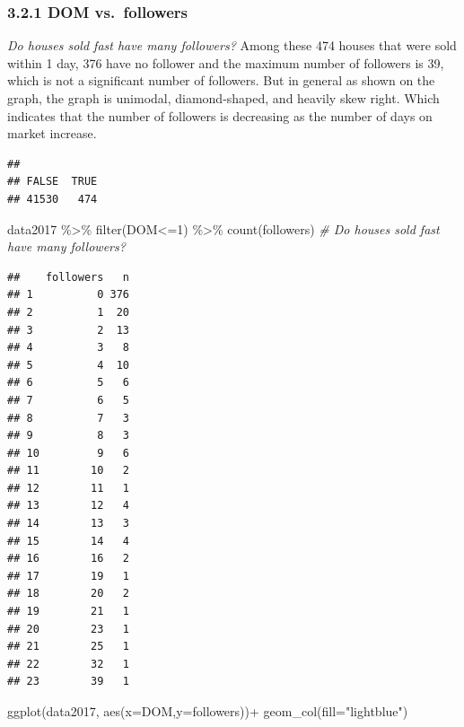 \documentclass[
]{article}
\newenvironment{Shaded}{\begin{snugshade}}{\end{snugshade}}
\newcommand{\AttributeTok}[1]{\textcolor[rgb]{0.77,0.63,0.00}{#1}}
\newcommand{\CommentTok}[1]{\textcolor[rgb]{0.56,0.35,0.01}{\textit{#1}}}
\newcommand{\DecValTok}[1]{\textcolor[rgb]{0.00,0.00,0.81}{#1}}
\newcommand{\FunctionTok}[1]{\textcolor[rgb]{0.00,0.00,0.00}{#1}}
\newcommand{\NormalTok}[1]{#1}
\newcommand{\SpecialCharTok}[1]{\textcolor[rgb]{0.00,0.00,0.00}{#1}}
\newcommand{\StringTok}[1]{\textcolor[rgb]{0.31,0.60,0.02}{#1}}
\begin{document}
\hypertarget{dom-vs.-followers}{%
\subsubsection{3.2.1 DOM vs.~followers}\label{dom-vs.-followers}}

\emph{Do houses sold fast have many followers?} Among these 474 houses
that were sold within 1 day, 376 have no follower and the maximum number
of followers is 39, which is not a significant number of followers. But
in general as shown on the graph, the graph is unimodal, diamond-shaped,
and heavily skew right. Which indicates that the number of followers is
decreasing as the number of days on market increase.

\begin{Shaded}
\end{Shaded}

\begin{verbatim}
## 
## FALSE  TRUE 
## 41530   474
\end{verbatim}

\begin{Shaded}
\begin{Highlighting}[]
\NormalTok{data2017 }\SpecialCharTok{\%\textgreater{}\%}
  \FunctionTok{filter}\NormalTok{(DOM}\SpecialCharTok{\textless{}=}\DecValTok{1}\NormalTok{) }\SpecialCharTok{\%\textgreater{}\%}
  \FunctionTok{count}\NormalTok{(followers) }\CommentTok{\# Do houses sold fast have many followers?}
\end{Highlighting}
\end{Shaded}

\begin{verbatim}
##    followers   n
## 1          0 376
## 2          1  20
## 3          2  13
## 4          3   8
## 5          4  10
## 6          5   6
## 7          6   5
## 8          7   3
## 9          8   3
## 10         9   6
## 11        10   2
## 12        11   1
## 13        12   4
## 14        13   3
## 15        14   4
## 16        16   2
## 17        19   1
## 18        20   2
## 19        21   1
## 20        23   1
## 21        25   1
## 22        32   1
## 23        39   1
\end{verbatim}

\begin{Shaded}
\begin{Highlighting}[]
\FunctionTok{ggplot}\NormalTok{(data2017, }\FunctionTok{aes}\NormalTok{(}\AttributeTok{x=}\NormalTok{DOM,}\AttributeTok{y=}\NormalTok{followers))}\SpecialCharTok{+}
  \FunctionTok{geom\_col}\NormalTok{(}\AttributeTok{fill=}\StringTok{"lightblue"}\NormalTok{)}
\end{Highlighting}
\end{Shaded}
\end{document}
